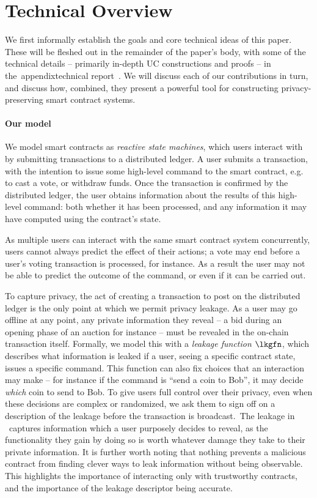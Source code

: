 \section{Technical Overview}
\label{sec:overview}

We first informally establish the goals and core technical ideas of this
paper. These will be fleshed out in the remainder of the paper's body, with some
of the technical details -- primarily in-depth UC constructions and proofs -- in
the\ \iffull appendix\else technical report~\cite{fullversion}\fi.
We will discuss each of our contributions in turn, and discuss how,
combined, they present a powerful tool for constructing privacy-preserving smart
contract systems.

\paragraph{Our model}

We model smart contracts as \emph{reactive state machines}, which users interact
with by submitting transactions to a distributed ledger. A user submits a
transaction, with the intention to issue some high-level command to the
smart contract, e.g. to cast a vote, or withdraw funds. Once the
transaction is confirmed by the distributed ledger, the user obtains information
about the results of this high-level command: both whether it has been processed, and any
information it may have computed using the contract's state.

As multiple users can interact with the same smart contract system concurrently,
users cannot always predict the effect of their actions; a vote may end before
a user's voting transaction is processed, for instance. As a result the user
may not be able to predict the outcome of the command, or even if it can be
carried out.

To capture privacy, the act of creating a transaction to post on the
distributed ledger is the only point at which we permit privacy leakage. As a
user may go offline at any point, any private information they reveal -- a bid
during an opening phase of an auction for instance -- must be revealed in the
on-chain transaction itself. Formally, we model this with a \emph{leakage
  function} $\lkgfn$, which describes what information is leaked if a user,
seeing a specific contract state, issues a specific command. This function can
also fix choices that an interaction may make -- for instance if the command is ``send a coin
to Bob'', it may decide \emph{which} coin to send to Bob. To give users full
control over their privacy, even when these decisions are complex or randomized,
we ask them to sign off on a description of the leakage before the transaction
is broadcast.\ The leakage in \kachina\ captures
  information which a user purposely decides to reveal, as the functionality
  they gain by doing so is worth whatever damage they take to their private
  information. It is further worth noting that nothing prevents a malicious
  contract from finding clever ways to leak information without being
  observable. This highlights the importance of interacting only with
  trustworthy contracts, and the importance of the leakage descriptor being accurate.

